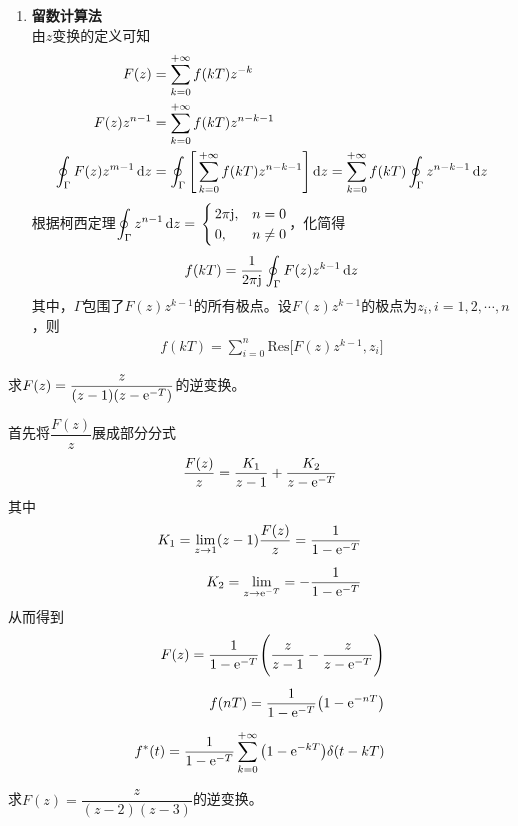 \begin{enumerate}[\textbf{方法} 1 ]
	\item \textbf{留数计算法}\\
	由$z$变换的定义可知
	\begin{align}
		F(z) &= \sum_{k=0}^{+\infty} f(kT)z^{-k}\\
		F(z)z^{n-1} &= \sum_{k=0}^{+\infty}f(kT)z^{n-k-1}\\
		\oint_\Gamma F(z)z^{m-1}\,{\rm{d}} z &=\oint_\Gamma \Bigg[\sum_{k=0}^{+\infty}f(kT)z^{n-k-1}\Bigg]\,{\rm{d}} z = \sum_{k=0}^{+\infty} f(kT)\oint_\Gamma z^{n-k-1}\,{\rm{d}} z
	\end{align}
	根据柯西定理$\displaystyle \oint_\Gamma z^{n-1}\, {\rm{d}} z = 
	\,
	\begin{cases}
		\, 2\pi \text{j}, &n = 0\\
		\, 0, & n \neq 0
	\end{cases}
	$，化简得
	\begin{align}
		f(kT) = \dfrac{1}{2\pi\text{j}} \oint_\Gamma F(z)z^{k-1} \, {\rm{d}} z
	\end{align}
	其中，$\Gamma$包围了$F(z)z^{k-1}$的所有极点。设$F(z)z^{k-1}$的极点为$z_i,i=1,2,\cdots,n$，则
	\begin{align}
		f(kT) = \sum_{i=0}^n \text{Res}\big[F(z)z^{k-1},z_i\big]
	\end{align}
\end{enumerate}

\examples 求$F(z)=\dfrac{z}{(z-1)(z-{\rm{e}}^{-T})}$的逆变换。

\solve 首先将$\dfrac{F(z)}{z}$展成部分分式
\[
\dfrac{F(z)}{z} = \dfrac{K_1}{z-1} + \dfrac{K_2}{z-{\rm{e}}^{-T}}
\]
其中
\begin{align*}
	K_1 = \lim\limits_{z \to 1} (z-1)\dfrac{F(z)}{z} = \dfrac{1}{1- {\rm{e}}^{-T}}\\[0.5em]
	K_2 = \lim\limits_{z \to {\rm{e}}^{-T}} = - \dfrac{1}{1 - {\rm{e}}^{-T}}
\end{align*}
从而得到
\begin{align}
	F(z) = \dfrac{1}{1 - {\rm{e}}^{-T}}\Bigg(\dfrac{z}{z-1} - \dfrac{z}{z-{\rm{e}}^{-T}}\Bigg)\\[0.5em]
	f(nT) = \dfrac{1}{1 - {\rm{e}}^{-T}}\big(1 - {\rm{e}}^{-nT}\big)\\[0.5em]
	f^*(t) = \dfrac{1}{1 - {\rm{e}}^{-T}}\sum_{k = 0}^{+\infty} \big(1 - {\rm{e}}^{-kT}\big)\delta (t - kT)
\end{align}

\examples 求$F(z)=\dfrac{z}{(z-2)(z-3)}$的逆变换。

